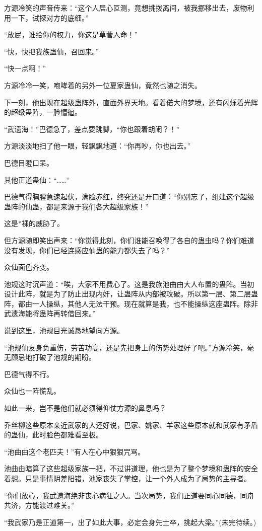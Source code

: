 \begin{this_body}
方源冷笑的声音传来：“这个人居心叵测，竟想挑拨离间，被我挪移出去，废物利用一下，试探对方的底细。”

“放屁，谁给你的权力，你这是草菅人命！”

“快，快把我族蛊仙，召回来。”

“快一点啊！”

方源冷冷一笑，咆哮着的另外一位夏家蛊仙，竟然也随之消失。

下一刻，他出现在超级蛊阵外，直面外界天地。看着偌大的梦境，还有闪烁着光辉的超级蛊阵，一脸懵逼。

“武遗海！”巴德急了，差点要跳脚，“你也跟着胡闹？！”

方源淡淡地扫了他一眼，轻飘飘地道：“你再吵，你也出去。”

巴德目瞪口呆。

其他正道蛊仙：“……”

巴德气得胸膛急速起伏，满脸赤红，终究还是开口道：“你别忘了，组建这个超级蛊阵的仙蛊，都是来源于我们各大超级家族！”

这是*裸的威胁了。

但方源随即笑出声来：“你觉得此刻，你们谁能召唤得了各自的蛊虫吗？你们难道没有发现，你们已经连感应仙蛊的能力都失去了吗？”

众仙面色齐变。

池规这时沉声道：“唉，大家不用费心了。这是我族池曲由大人布置的蛊阵。当初设计此阵，就是为了防止出现内奸，让蛊阵从内部被攻破。所以第一层、第二层蛊阵，都由一人操纵，其他人无法干预。现在就算是我，也不能操纵这座蛊阵。除非武遗海能将蛊阵再转借回来。”

说到这里，池规目光诚恳地望向方源。

“池规仙友身负重伤，劳苦功高，还是先把身上的伤势处理好了吧。”方源冷笑，毫无顾忌地打破了池规的期盼。

巴德气得不行。

众仙也一阵慌乱。

如此一来，岂不是他们就必须得仰仗方源的鼻息吗？

乔丝柳这些原本亲近武家的人还好说，巴家、姚家、羊家这些原本就和武家有矛盾的蛊仙，此时脸色都难看至极。

“池曲由这个老匹夫！”有人在心中狠狠咒骂。

池曲由暗算了这些超级家族一把，不过讲道理，他也是为了整个梦境和蛊阵的安全着想。只是事情阴差阳错，池家丧失了掌控，让一个外人成为了局势的主导者。

“你们放心，我武遗海绝非丧心病狂之人。当次局势，我们正道要同心同德，同舟共济，方能渡过难关。”

“我武家乃是正道第一，出了如此大事，必定会身先士卒，挑起大梁。”(未完待续。)

\end{this_body}

